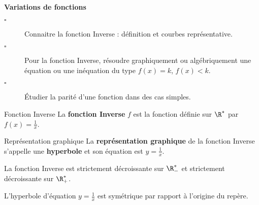 \begin{titre}

\end{titre}



\begin{CpsCol}
\textbf{Variations de fonctions}
\begin{description}
\item[$\square$] Connaitre la fonction Inverse : définition et courbes représentative.
\item[$\square$] Pour la fonction Inverse, résoudre graphiquement ou algébriquement une équation ou une inéquation du type $f(x) = k$, $f(x) < k$.
\item[$\square$] Étudier la parité d'une fonction dans des cas simples.
\end{description}
\end{CpsCol}




\begin{DefT}{Fonction Inverse}
La \textbf{fonction Inverse} $f$ est la fonction définie sur $\R^*$ par $f(x)=\frac{1}{x}$.
\end{DefT}


\begin{DefT}{Représentation graphique} 
La \textbf{représentation graphique} de la fonction Inverse s'appelle une \textbf{hyperbole} et son équation est $y=\frac{1}{x}$. 
\end{DefT}



\begin{Pp}[Variations]
\begin{minipage}{0.48\linewidth}
La fonction Inverse est strictement décroissante sur $\R^*_-$ et strictement décroissante sur $\R^*_+$. 

L'hyperbole d'équation $y=\frac{1}{x}$ est symétrique par rapport à l'origine du repère.
\end{minipage}
\hfill
\begin{minipage}{0.48\linewidth}
\end{minipage}
\end{Pp}

